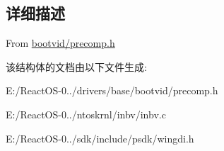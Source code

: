 \subsection{详细描述}
From \hyperlink{drivers_2base_2bootvid_2precomp_8h_source}{bootvid/precomp.\+h} 

该结构体的文档由以下文件生成\+:\begin{DoxyCompactItemize}
\item 
E\+:/\+React\+O\+S-\/0../drivers/base/bootvid/precomp.\+h\item 
E\+:/\+React\+O\+S-\/0../ntoskrnl/inbv/inbv.\+c\item 
E\+:/\+React\+O\+S-\/0../sdk/include/psdk/wingdi.\+h\end{DoxyCompactItemize}
